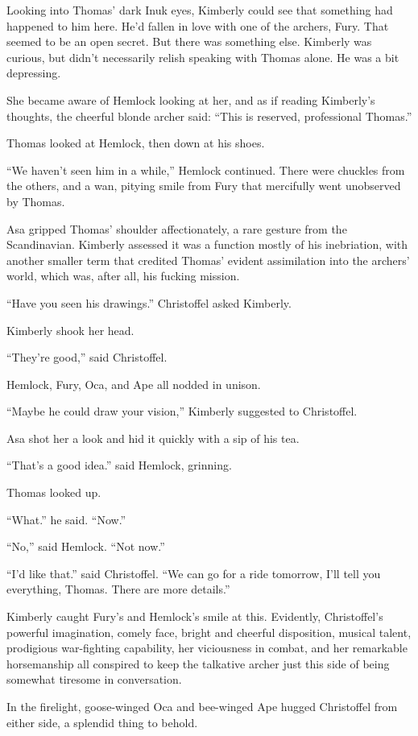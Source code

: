 \documentclass[11pt,a5paper]{article}
\begin{document}
Looking into Thomas' dark Inuk eyes, Kimberly could see that something had happened to him here. He'd fallen in love with one of the archers, Fury. That seemed to be an open secret. But there was something else. Kimberly was curious, but didn't necessarily relish speaking with Thomas alone. He was a bit depressing.

She became aware of Hemlock looking at her, and as if reading Kimberly's thoughts, the cheerful blonde archer said: ``This is reserved, professional Thomas.''

Thomas looked at Hemlock, then down at his shoes.

``We haven't seen him in a while,'' Hemlock continued. There were chuckles from the others, and a wan, pitying smile from Fury that mercifully went unobserved by Thomas.

Asa gripped Thomas' shoulder affectionately, a rare gesture from the Scandinavian. Kimberly assessed it was a function mostly of his inebriation, with another smaller term that credited Thomas' evident assimilation into the archers' world, which was, after all, his fucking mission.

``Have you seen his drawings.'' Christoffel asked Kimberly.

Kimberly shook her head.

``They're good,'' said Christoffel.

Hemlock, Fury, Oca, and Ape all nodded in unison.

``Maybe he could draw your vision,'' Kimberly suggested to Christoffel.

Asa shot her a look and hid it quickly with a sip of his tea.

``That's a good idea.'' said Hemlock, grinning.

Thomas looked up.

``What.'' he said. ``Now.''

``No,'' said Hemlock. ``Not now.''

``I'd like that.'' said Christoffel. ``We can go for a ride tomorrow, I'll tell you everything, Thomas. There are more details.''

Kimberly caught Fury's and Hemlock's smile at this. Evidently, Christoffel's powerful imagination, comely face, bright and cheerful disposition, musical talent, prodigious war-fighting capability, her viciousness in combat, and her remarkable horsemanship all conspired to keep the talkative archer just this side of being somewhat tiresome in conversation.

In the firelight, goose-winged Oca and bee-winged Ape hugged Christoffel from either side, a splendid thing to behold.
\end{document}

